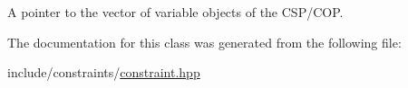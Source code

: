 A pointer to the vector of variable objects of the C\-S\-P/\-C\-O\-P. 



The documentation for this class was generated from the following file\-:\begin{DoxyCompactItemize}
\item 
include/constraints/\hyperlink{constraint_8hpp}{constraint.\-hpp}\end{DoxyCompactItemize}
